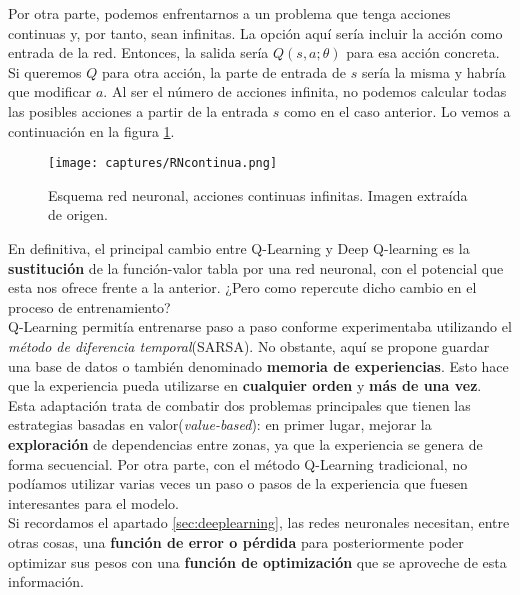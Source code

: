 \documentclass[11pt,fleqn]{book} %
\begin{document}
Por otra parte, podemos enfrentarnos a un problema que tenga acciones continuas y, por tanto, sean infinitas. La opción aquí sería incluir la acción como entrada de la red. Entonces, la salida sería $Q(s,a;\theta)$ para esa acción concreta. Si queremos $Q$ para otra acción, la parte de entrada de $s$ sería la misma y habría que modificar $a$. Al ser el número de acciones infinita, no podemos calcular todas las posibles acciones a partir de la entrada $s$ como en el caso anterior. Lo vemos a continuación en la figura \ref{fig:RNcontinua}.

\begin{figure}[H]
	\centering\texttt{[image: captures/RNcontinua.png]}
	\caption{Esquema red neuronal, acciones continuas infinitas. Imagen extraída de origen. \cite{article:RLromero}}
	\label{fig:RNcontinua} %
\end{figure}

En definitiva, el principal cambio entre Q-Learning y Deep Q-learning es la \textbf{sustitución} de la función-valor tabla por una red neuronal, con el potencial que esta nos ofrece frente a la anterior. ¿Pero como repercute dicho cambio en el proceso de entrenamiento? \\

Q-Learning permitía entrenarse paso a paso conforme experimentaba utilizando el \textit{método de diferencia temporal}(SARSA). No obstante, aquí se propone guardar una base de datos o también denominado \textbf{memoria de experiencias}. Esto hace que la experiencia pueda utilizarse en \textbf{cualquier orden} y \textbf{más de una vez}.\\

Esta adaptación trata de combatir dos problemas principales que tienen las estrategias basadas en valor(\textit{value-based}): en primer lugar, mejorar la \textbf{exploración} de dependencias entre zonas, ya que la experiencia se genera de forma secuencial. Por otra parte, con el método Q-Learning tradicional, no podíamos utilizar varias veces un paso o pasos de la experiencia que fuesen interesantes para el modelo. \\

Si recordamos el apartado \ref{sec:deeplearning}, las redes neuronales necesitan, entre otras cosas, una \textbf{función de error o pérdida} para posteriormente poder optimizar sus pesos con una \textbf{función de optimización} que se aproveche de esta información. \\
\end{document}
